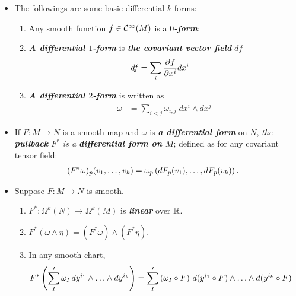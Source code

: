 \documentclass[11pt]{article}
\begin{document}
\begin{itemize}
\item \begin{example} The followings are some basic differential $k$-forms:
\begin{enumerate}
\item Any smooth function $f \in {\mathcal C}^{\infty}(M)$ is a \emph{\textbf{$0$-form}};
\item \emph{\textbf{A differential $1$-form}} is \emph{\textbf{the covariant vector field}} $df$
\begin{align*}
df &= \sum_{i}\frac{\partial f}{ \partial x^{i}}dx^{i}
\end{align*}
\item \emph{\textbf{A differential $2$-form}}  is written as
\begin{align*}
\omega &= \sum_{i < j}\omega_{i,j}\; dx^{i} \wedge dx^j
\end{align*}
\end{enumerate}
\end{example}

\item \begin{definition}
If $F: M \rightarrow N$ is a smooth map and $\omega$ is \emph{\textbf{a differential form}} on $N$, \emph{the \textbf{pullback} $F^{*}$ is a \textbf{differential form on $M$}}; defined as for any covariant tensor field:
\begin{align*}
(F^{*}\omega)_p(v_1, \ldots, v_k) &= \omega_p\left(dF_p(v_1), \ldots, dF_p(v_k)\right).
\end{align*}
\end{definition}

\item \begin{lemma}
Suppose $F: M \rightarrow N$ is smooth.
\begin{enumerate}
\item $F^{*}: \Omega^k(N) \rightarrow \Omega^k(M)$ is \emph{\textbf{linear}} over ${\mathbb R}$.
\item $F^{*}(\omega \wedge \eta) = (F^{*}\omega) \wedge (F^{*}\eta)$.
\item  In any smooth chart,
\begin{align}
F^{*}\left(\sum_{I}'\omega_{I}\,dy^{i_1} \wedge \ldots \wedge dy^{i_k}\right) &= \sum_{I}'\left(\omega_I \circ F\right)\,d(y^{i_1} \circ F) \wedge \ldots \wedge d(y^{i_k} \circ F) \label{eqn: differential_form_pull_back_coordinate_0}
\end{align}
\end{enumerate}
\end{lemma}


\end{itemize}
\end{document}
